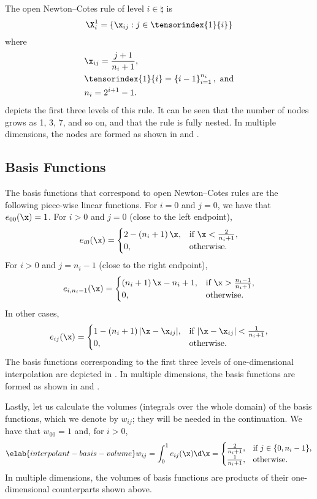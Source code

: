 The open Newton--Cotes rule of level $i \in \natural$ is
\[
  \X^1_i = \left\{ \x_{ij}: j \in \tensorindex{1}{i} \right\}
\]
where
\begin{align*}
  & \x_{ij} = \frac{j + 1}{n_i + 1}, \\
  & \tensorindex{1}{i} = \left\{ i - 1 \right\}_{i = 1}^{n_i}, \text{ and} \\
  & n_i = 2^{i + 1} - 1.
\end{align*}
 depicts the first three levels of this rule. It can be
seen that the number of nodes grows as 1, 3, 7, and so on, and that the rule is
fully nested. In multiple dimensions, the nodes are formed as shown in
 and .

\subsection{Basis Functions}

The basis functions that correspond to open Newton--Cotes rules are the
following piece-wise linear functions. For $i = 0$ and $j = 0$, we have that
$e_{00}(\x) = 1$. For $i > 0$ and $j = 0$ (close to the left endpoint),
\[
  e_{i0}(\x) =
  \begin{cases}
    2 - \left(n_i + 1\right) \x, & \text{if } \x < \frac{2}{n_i + 1}, \\
    0, & \text{otherwise}.
  \end{cases}
\]
For $i > 0$ and $j = n_i - 1$ (close to the right endpoint),
\[
  e_{i, n_i - 1}(\x) =
  \begin{cases}
    \left(n_i + 1\right) \x - n_i + 1, & \text{if } \x > \frac{n_i - 1}{n_i + 1}, \\
    0, & \text{otherwise}.
  \end{cases}
\]
In other cases,
\[
  e_{ij}(\x) =
  \begin{cases}
    1 - \left(n_i + 1\right)|\x - \x_{ij}|, & \text{if } |\x - \x_{ij}| < \frac{1}{n_i + 1}, \\
    0, & \text{otherwise}.
  \end{cases}
\]
The basis functions corresponding to the first three levels of one-dimensional
interpolation are depicted in . In multiple dimensions,
the basis functions are formed as shown in  and
.

Lastly, let us calculate the volumes (integrals over the whole domain) of the
basis functions, which we denote by $w_{ij}$; they will be needed in the
continuation. We have that $w_{00} = 1$ and, for $i > 0$,
\begin{equation} \elab{interpolant-basis-volume}
  w_{ij} = \int_0^1 e_{ij}(\x) \d \x =
  \begin{cases}
    \frac{2}{n_i + 1}, & \text{if } j \in \{ 0, n_i - 1 \}, \\
    \frac{1}{n_i + 1}, & \text{otherwise}.
  \end{cases}
\end{equation}
In multiple dimensions, the volumes of basis functions are products of
their one-dimensional counterparts shown above.

